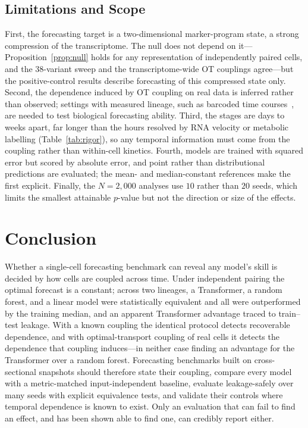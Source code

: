 \documentclass[10pt,journal,compsoc]{IEEEtran}
\begin{document}
\subsection{Limitations and Scope}
First, the forecasting target is a two-dimensional marker-program state, a strong compression of the transcriptome. The null does not depend on it---Proposition~\ref{prop:null} holds for any representation of independently paired cells, and the $38$-variant sweep and the transcriptome-wide OT couplings agree---but the positive-control results describe forecasting of this compressed state only. Second, the dependence induced by OT coupling on real data is inferred rather than observed; settings with measured lineage, such as barcoded time courses~\cite{weinreb2020lineage}, are needed to test biological forecasting ability. Third, the stages are days to weeks apart, far longer than the hours resolved by RNA velocity or metabolic labelling (Table~\ref{tab:rigor}), so any temporal information must come from the coupling rather than within-cell kinetics. Fourth, models are trained with squared error but scored by absolute error, and point rather than distributional predictions are evaluated; the mean- and median-constant references make the first explicit. Finally, the $N=2{,}000$ analyses use $10$ rather than $20$ seeds, which limits the smallest attainable $p$-value but not the direction or size of the effects.

\section{Conclusion}
\label{sec:conclusion}
Whether a single-cell forecasting benchmark can reveal any model's skill is decided by how cells are coupled across time. Under independent pairing the optimal forecast is a constant; across two lineages, a Transformer, a random forest, and a linear model were statistically equivalent and all were outperformed by the training median, and an apparent Transformer advantage traced to train--test leakage. With a known coupling the identical protocol detects recoverable dependence, and with optimal-transport coupling of real cells it detects the dependence that coupling induces---in neither case finding an advantage for the Transformer over a random forest. Forecasting benchmarks built on cross-sectional snapshots should therefore state their coupling, compare every model with a metric-matched input-independent baseline, evaluate leakage-safely over many seeds with explicit equivalence tests, and validate their controls where temporal dependence is known to exist. Only an evaluation that can fail to find an effect, and has been shown able to find one, can credibly report either.
\end{document}
